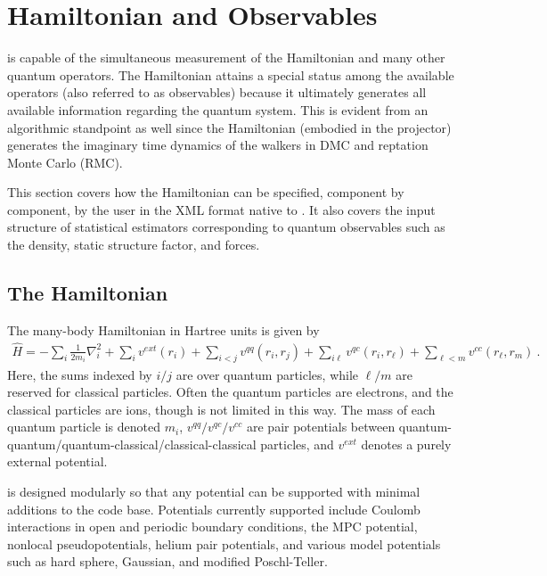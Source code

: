 \chapter{Hamiltonian and Observables}
\label{chap:hamiltobs}


\qmcpack is capable of the simultaneous measurement of the Hamiltonian and many other quantum operators.  The Hamiltonian attains a special status among the available operators (also referred to as observables) because it ultimately generates all available information regarding the quantum system.  This is evident from an algorithmic standpoint as well since the Hamiltonian (embodied in the projector) generates the imaginary time dynamics of the walkers in DMC and reptation Monte Carlo (RMC). 

This section covers how the Hamiltonian can be specified, component by component, by the user in the XML format native to \qmcpack. It also covers the input structure of statistical estimators corresponding to quantum observables such as the density, static structure factor, and forces.



\section{The Hamiltonian}

The many-body Hamiltonian in Hartree units is given by
\begin{align}
  \hat{H} = -\sum_i\frac{1}{2m_i}\nabla_i^2 + \sum_iv^{ext}(r_i) + \sum_{i<j}v^{qq}(r_i,r_j)   + \sum_{i\ell}v^{qc}(r_i,r_\ell)   + \sum_{\ell<m}v^{cc}(r_\ell,r_m)\:.  
\end{align}
Here, the sums indexed by $i/j$ are over quantum particles, while $\ell/m$ are reserved for classical particles.  Often the quantum particles are electrons, and the classical particles are ions, though \qmcpack is not limited in this way.  The mass of each quantum particle is denoted $m_i$, $v^{qq}/v^{qc}/v^{cc}$ are pair potentials between quantum-quantum/quantum-classical/classical-classical particles, and $v^{ext}$ denotes a purely external potential.

\qmcpack is designed modularly so that any potential can be supported with minimal additions to the code base.  Potentials currently supported include Coulomb interactions in open and periodic boundary conditions, the MPC potential, nonlocal pseudopotentials, helium pair potentials, and various model potentials such as hard sphere, Gaussian, and modified Poschl-Teller.

